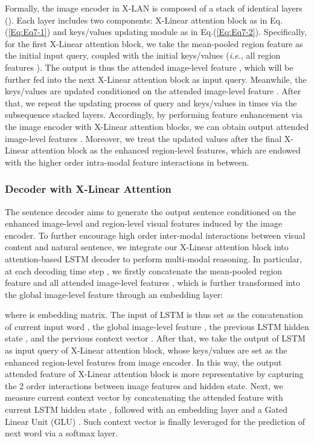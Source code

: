 \documentclass[10pt,twocolumn,letterpaper]{article}
\begin{document}
Formally, the image encoder in X-LAN is composed of a stack of  identical layers (). Each layer includes two components: X-Linear attention block as in Eq.(\ref{Eq:Eq7-1}) and keys/values updating module as in Eq.(\ref{Eq:Eq7-2}). Specifically, for the first X-Linear attention block, we take the mean-pooled region feature  as the initial input query, coupled with the initial keys/values (\emph{i.e.}, all region features ). The output is thus the attended image-level feature , which will be further fed into the next X-Linear attention block as input query. Meanwhile, the keys/values are updated conditioned on the attended image-level feature . After that, we repeat the updating process of query and keys/values in  times via the subsequence  stacked layers. Accordingly, by performing feature enhancement via the image encoder with  X-Linear attention blocks, we can obtain  output attended image-level features . Moreover, we treat the updated values  after the final X-Linear attention block as the enhanced region-level features, which are endowed with the higher order intra-modal feature interactions in between.

\subsubsection{Decoder with X-Linear Attention}
The sentence decoder aims to generate the output sentence conditioned on the enhanced image-level and region-level visual features induced by the image encoder. To further encourage high order inter-modal interactions between visual content and natural sentence, we integrate our X-Linear attention block into attention-based LSTM decoder to perform multi-modal reasoning. In particular, at each decoding time step , we firstly concatenate the mean-pooled region feature  and all attended image-level features , which is further transformed into the global image-level feature  through an embedding layer:

where  is embedding matrix. The input of LSTM is thus set as the concatenation of current input word , the global image-level feature , the previous LSTM hidden state , and the pervious context vector . After that, we take the output of LSTM  as input query of X-Linear attention block, whose keys/values are set as the enhanced region-level features  from image encoder. In this way, the output attended feature  of X-Linear attention block is more representative by capturing the 2 order interactions between image features and hidden state. Next, we measure current context vector  by concatenating the attended feature  with current LSTM hidden state , followed with an embedding layer and a Gated Linear Unit (GLU) \cite{dauphin2017language}. Such context vector  is finally leveraged for the prediction of next word  via a softmax layer.
\end{document}
